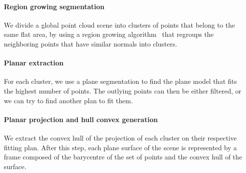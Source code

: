 \paragraph{Region growing segmentation}
We divide a global point cloud scene into clusters of points that belong to the same flat area, by using a region growing algorithm~\cite{poppinga:iros:2008} that regroups the neighboring points that have similar normals into clusters.

\paragraph{Planar extraction}
For each cluster, we use a plane segmentation to find the plane model that fits the highest number of points.
The outlying points can then be either filtered, or we can try to find another plan to fit them.

\paragraph{Planar projection and hull convex generation}
We extract the convex hull of the projection of each cluster on their respective fitting plan.
After this step, each plane surface of the scene is represented by a frame composed of the barycentre of the set of points and the convex hull of the surface.

